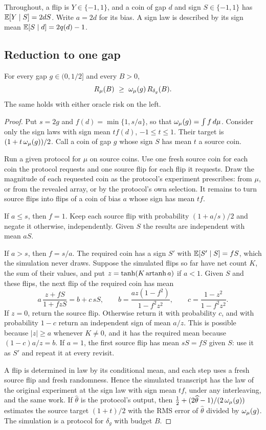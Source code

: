 Throughout, a flip is $Y\in\{-1,1\}$, and a coin of gap $d$ and sign
$S\in\{-1,1\}$ has $\mathbb E[Y\mid S]=2dS$. Write $a=2d$ for its bias. A sign
law is described by its sign mean $\mathbb E[S\mid d]=2q(d)-1$.

\subsection{Reduction to one gap}

\begin{lemma}\label{lem:sharp-reduction}
For every gap $g\in(0,1/2]$ and every $B>0$,
\[
 R_\mu(B)\ \ge\ \om(g)\,R_{\delta_g}(B).
\]
The same holds with either oracle risk on the left.
\end{lemma}

\begin{proof}
Put $s=2g$ and $f(d)=\min\{1,s/a\}$, so that $\omega_\mu(g)=\int f\,d\mu$.
Consider only the sign laws with sign mean $tf(d)$, $-1\le t\le1$. Their
target is $(1+t\,\omega_\mu(g))/2$. Call a coin of gap $g$ whose sign $S$ has mean
$t$ a source coin.

Run a given protocol for $\mu$ on source coins. Use one fresh source coin
for each coin the protocol requests and one source flip for each flip it
requests. Draw the magnitude of each requested coin as the protocol's
experiment prescribes: from $\mu$, or from the revealed array, or by the
protocol's own selection. It remains to turn source flips into flips of a
coin of bias $a$ whose sign has mean $tf$.

If $a\le s$, then $f=1$. Keep each source flip with probability
$(1+a/s)/2$ and negate it otherwise, independently. Given $S$ the results
are independent with mean $aS$.

If $a>s$, then $f=s/a$. The required coin has a sign $S'$ with
$\mathbb E[S'\mid S]=fS$, which the simulation never draws. Suppose the simulated
flips so far have net count $K$, the sum of their values, and put
$z=\tanh(K\operatorname{artanh} a)$ if $a<1$.
Given $S$ and these flips, the next flip of the required coin has mean
\[
 a\,\frac{z+fS}{1+fzS}=b+c\,sS,\qquad
 b=\frac{az(1-f^2)}{1-f^2z^2},\qquad c=\frac{1-z^2}{1-f^2z^2}.
\]
If $z=0$, return the source flip. Otherwise return it with probability
$c$, and with probability $1-c$ return an independent sign of mean $a/z$.
This is possible because $|z|\ge a$ whenever $K\ne0$, and it has the
required mean because $(1-c)a/z=b$. If $a=1$, the first source flip has
mean $sS=fS$ given $S$: use it as $S'$ and repeat it at every revisit.

A flip is determined in law by its conditional mean, and each step uses a
fresh source flip and fresh randomness. Hence the simulated transcript has
the law of the original experiment at the sign law with sign mean $tf$,
under any interleaving, and the same work. If $\widehat\theta$ is the
protocol's output, then $\tfrac12+(2\widehat\theta-1)/(2\,\omega_\mu(g))$
estimates the source target $(1+t)/2$ with the RMS error of
$\widehat\theta$ divided by $\omega_\mu(g)$. The simulation is a protocol for
$\delta_g$ with budget $B$.
\end{proof}


